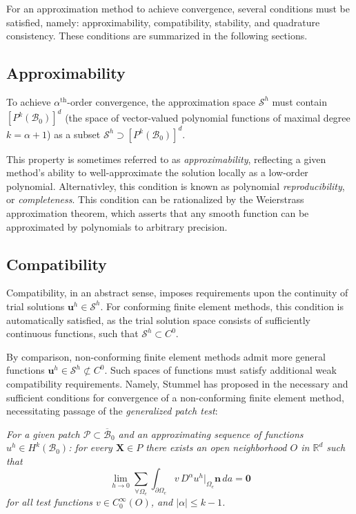 For an approximation method to achieve convergence, several conditions must be satisfied, namely: approximability, compatibility, stability, and quadrature consistency. These conditions are summarized in the following sections.

	\subsection*{Approximability}
	
	To achieve $\alpha^{\text{th}}$-order convergence, the approximation space $\mathcal{S}^h$ must contain $[ P^{k} (\mathcal{B}_0) ]^d$ (the space of vector-valued polynomial functions of maximal degree $k = \alpha+1$) as a subset $\mathcal{S}^h \supset [ P^{k} (\mathcal{B}_0) ]^d$.
	
	This property is sometimes referred to as \textit{approximability}, reflecting a given method's ability to well-approximate the solution locally as a low-order polynomial. Alternativley, this condition is known as polynomial \textit{reproducibility}, or \textit{completeness}. This condition can be rationalized by the Weierstrass approximation theorem, which asserts that any smooth function can be approximated by polynomials to arbitrary precision.
	
	\subsection*{Compatibility}

	 Compatibility, in an abstract sense, imposes requirements upon the continuity of trial solutions $\mathbf{u}^h \in \mathcal{S}^h$. For conforming finite element methods, this condition is automatically satisfied, as the trial solution space consists of sufficiently continuous functions, such that $\mathcal{S}^h \subset C^0$.

By comparison, non-conforming finite element methods admit more general functions $\mathbf{u}^h \in \mathcal{S}^h \not\subset C^0$. Such spaces of functions must satisfy additional weak compatibility requirements. Namely, Stummel has proposed in \cite{Stummel:79} the necessary and sufficient conditions for convergence of a non-conforming finite element method, necessitating passage of the \textit{generalized patch test}:

\textit{For a given patch $\mathcal{P} \subset \overline{\mathcal{B}}_0$ and an approximating sequence of functions $u^h \in H^k (\mathcal{B}_0)$: for every $\mathbf{X} \in P$ there exists an open neighborhood $O$ in $\mathbb{R}^d$ such that}
\begin{equation}
  \lim_{h \rightarrow 0} \sum_{\forall \Omega_e} \int_{\partial \Omega_e} v \, D^\alpha u^h|_{\Omega_e} \mathbf{n} \, da = \mathbf{0}
\end{equation}
\textit{for all test functions $v \in C^{\infty}_0 (O)$, and $| \alpha | \leq k-1$.}

